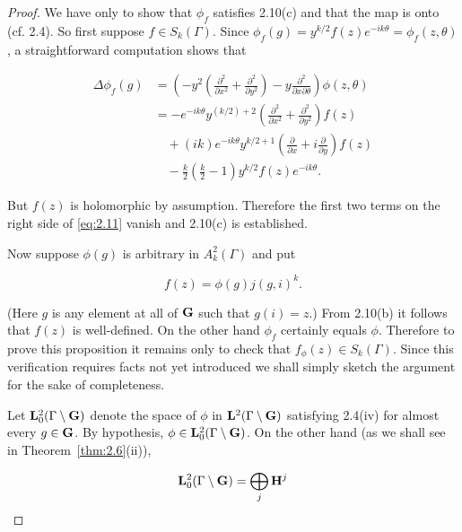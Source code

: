 \begin{proof}

We have only to show that $\phi_f$ satisfies 2.10(c) and that the map is onto (cf. 2.4). So first suppose $f \in S_k(\Gamma)$. Since $\phi_f(g) = y^{k/2}f(z)e^{-ik\theta} = \phi_f(z, \theta)$, a straightforward computation shows that

\begin{equation}\label{eq:2.11}
\begin{aligned}
\Delta\phi_f(g) &= \left(-y^2\left(\frac{\partial^2}{\partial x^2} + \frac{\partial^2}{\partial y^2}\right) - y \frac{\partial^2}{\partial x \partial \theta}\right)\phi(z, \theta)\\
&= -e^{-ik\theta} y^{(k/2) + 2}\left(\frac{\partial^2}{\partial x^2} + \frac{\partial^2}{\partial y^2}\right) f(z)\\
&\quad + (ik)e^{-ik\theta} y^{k/2 + 1}\left(\frac{\partial}{\partial x} + i\frac{\partial}{\partial y}\right) f(z)\\
&\quad - \frac{k}{2}\left(\frac{k}{2} - 1\right) y^{k/2} f(z) e^{-ik\theta}.
\end{aligned}\tag{2.11}
\end{equation}

But $f(z)$ is holomorphic by assumption. Therefore the first two terms on the right side of \eqref{eq:2.11} vanish and 2.10(c) is established.

Now suppose $\phi(g)$ is arbitrary in $A_k^2(\Gamma)$ and put

\begin{equation}\label{eq:2.12}
f(z) = \phi(g) j(g, i)^{k}.\tag{2.12}
\end{equation}

(Here $g$ is any element at all of $\mathbf{G}$ such that $g(i) = z$.) From 2.10(b) it follows that $f(z)$ is well-defined. On the other hand $\phi_f$ certainly equals $\phi$. Therefore to prove this proposition it remains only to check that $f_{\phi}(z) \in S_k(\Gamma)$. Since this verification requires facts not yet introduced we shall simply sketch the argument for the sake of completeness.

Let $\mathbf{L}_0^2(\Gamma \setminus \mathbf{G})$ denote the space of $\phi$ in $\mathbf{L}^2(\Gamma \setminus \mathbf{G})$ satisfying 2.4(iv) for almost every $g \in \mathbf{G}$. By hypothesis, $\phi \in \mathbf{L}_0^2(\Gamma \setminus \mathbf{G})$. On the other hand (as we shall see in Theorem~\ref{thm:2.6}(ii)),

\[
\mathbf{L}_0^2(\Gamma \setminus \mathbf{G}) = \bigoplus_j \mathbf{H}^{j}
\]


\end{proof}
